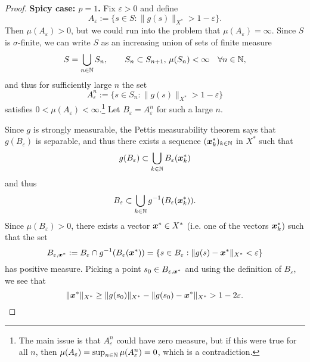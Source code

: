 \begin{proof}
  \textbf{Spicy case: $p=1$.}
  Fix $\varepsilon > 0$ and define
  \begin{equation}
    A_{\varepsilon} := \{s \in S : \|g(s)\|_{X^*} > 1-\varepsilon\}.
  \end{equation}
  Then $\mu(A_\varepsilon) > 0$, but we could run into the problem that $\mu(A_\varepsilon) = \infty$.
  Since $S$ is $\sigma$-finite, we can write $S$ as an increasing union of sets of finite measure
  \begin{equation*}
    S = \bigcup_{n \in \mathbb{N}} S_n, \qquad S_n \subset S_{n+1}, \, \mu(S_n) < \infty \quad \forall n \in \mathbb{N},
  \end{equation*}
  and thus for sufficiently large $n$ the set
  \begin{equation*}
    A_{\varepsilon}^{n} := \{s \in S_n : \|g(s)\|_{X^*} > 1 - \varepsilon\}
  \end{equation*}
  satisfies $0 < \mu(A_\varepsilon) < \infty$.\footnote{The main issue is that $A_{\varepsilon}^{n}$ could have zero measure, but if this were true for all $n$, then $\mu(A_{\varepsilon}) = \sup_{n \in \mathbb{N}} \mu(A_{\varepsilon}^n) = 0$, which is a contradiction.}
  Let $B_\varepsilon = A_{\varepsilon}^{n}$ for such a large $n$.

  Since $g$ is strongly measurable, the Pettis measurability theorem says that $g(B_\varepsilon)$ is separable, and thus there exists a sequence $(\bm{x}^*_{k})_{k \in \mathbb{N}}$ in $X^*$ such that
  \begin{equation*}
    g(B_\varepsilon) \subset \bigcup_{k \in \mathbb{N}} B_{\varepsilon}(\bm{x}^{*}_{k})
  \end{equation*}
  and thus
  \begin{equation*}
    B_{\varepsilon} \subset \bigcup_{k \in \mathbb{N}} g^{-1}(B_{\varepsilon}(\bm{x}^{*}_{k})).
  \end{equation*}
  Since $\mu(B_{\varepsilon}) > 0$, there exists a vector $\bm{x}^* \in X^*$ (i.e. one of the vectors $\bm{x}_k^{*}$) such that the set
  \begin{equation*}
     B_{\varepsilon, \bm{x}^*} := B_\varepsilon \cap g^{-1}(B_{\varepsilon}(\bm{x}^{*})) = \{s \in B_\varepsilon : \|g(s) - \bm{x}^{*}\|_{X^*} < \varepsilon\}
  \end{equation*}
  has positive measure.
  Picking a point $s_0 \in B_{\varepsilon, \bm{x}^*}$ and using the definition of $B_{\varepsilon}$, we see that
  \begin{equation*}
    \|\bm{x}^*\|_{X^*} \geq \|g(s_0)\|_{X^*} - \|g(s_0) - \bm{x}^*\|_{X^*} > 1 - 2\varepsilon.
  \end{equation*}


\end{proof}
